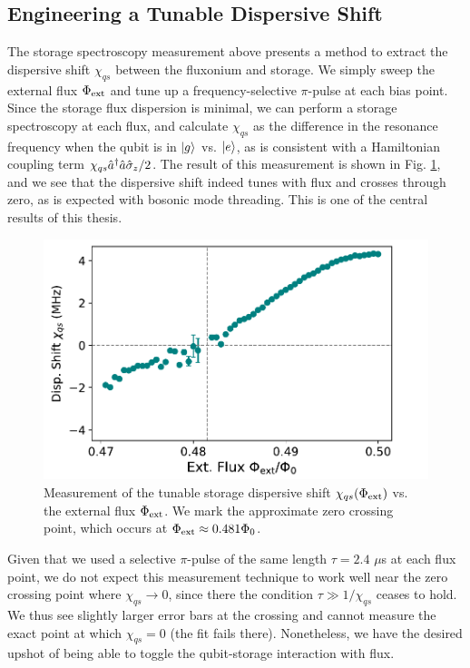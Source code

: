 \subsection{Engineering a Tunable Dispersive Shift}

The storage spectroscopy measurement above presents a method to extract the dispersive shift $\chi_{qs}$ between the fluxonium and storage. We simply sweep the external flux $\Phi_{\rm ext}$ and tune up a frequency-selective $\pi$-pulse at each bias point. Since the storage flux dispersion is minimal, we can perform a storage spectroscopy at each flux, and calculate $\chi_{qs}$ as the difference in the resonance frequency when the qubit is in $\lvert g\rangle$ vs. $\lvert e\rangle$, as is consistent with a Hamiltonian coupling term $\chi_{qs} \hat{a}^\dagger\hat{a}\hat{\sigma}_z/2$. The result of this measurement is shown in Fig. \ref{fig:4_tunable_chi}, and we see that the dispersive shift indeed tunes with flux and crosses through zero, as is expected with bosonic mode threading. This is one of the central results of this thesis.

\begin{figure}[h]
    \centering
    \includegraphics[width=0.6\linewidth]{Figures/4/tunable_chi.pdf}
    \caption[Demonstration of a flux-tunable storage dispersive shift.]{Measurement of the tunable storage dispersive shift $\chi_{qs}(\Phi_{\rm ext})$ vs. the external flux $\Phi_{\rm ext}$. We mark the approximate zero crossing point, which occurs at $\Phi_{\rm ext} \approx 0.481\Phi_0$.}
    \label{fig:4_tunable_chi}
\end{figure}

Given that we used a selective $\pi$-pulse of the same length $\tau = 2.4$ $\mu$s at each flux point, we do not expect this measurement technique to work well near the zero crossing point where $\chi_{qs} \to 0$, since there the condition $\tau \gg 1/\chi_{qs}$ ceases to hold. We thus see slightly larger error bars at the crossing and cannot measure the exact point at which $\chi_{qs}=0$ (the fit fails there). Nonetheless, we have the desired upshot of being able to toggle the qubit-storage interaction with flux. 

